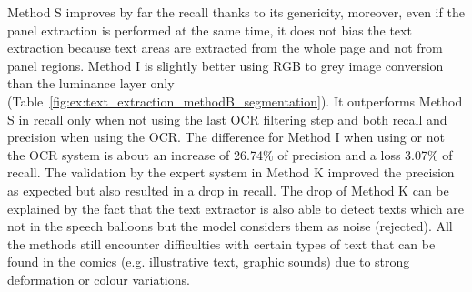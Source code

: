 Method S improves by far the recall thanks to its genericity, moreover, even if the panel extraction is performed at the same time, it does not bias the text extraction because text areas are extracted from the whole page and not from panel regions.
Method I is slightly better using RGB to grey image conversion than the luminance layer only (Table~\ref{fig:ex:text_extraction_methodB_segmentation}).
It outperforms Method S in recall only when not using the last OCR filtering step and both recall and precision when using the OCR.
The difference for Method I when using or not the OCR system is about an increase of 26.74\% of precision and a loss 3.07\% of recall.
The validation by the expert system in Method K improved the precision as expected but also resulted in a drop in recall.
The drop of Method K can be explained by the fact that the text extractor is also able to detect texts which are not in the speech balloons but the model considers them as noise (rejected).
All the methods still encounter difficulties with certain types of text that can be found in the comics (e.g. illustrative text, graphic sounds) due to strong deformation or colour variations.


